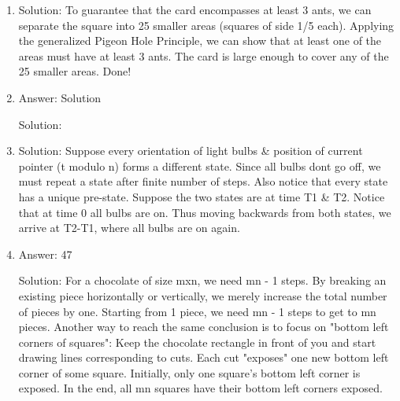 \begin{enumerate}
\item
Solution: To guarantee that the card encompasses at least 3 ants, we can separate the square into 25 smaller areas (squares of side 1/5 each). Applying the generalized Pigeon Hole Principle, we can show that at least one of the areas must have at least 3 ants. The card is large enough to cover any of the 25 smaller areas. Done!




\item
Answer: Solution
 
Solution: 




\item
Solution: Suppose every orientation of light bulbs \& position of current pointer (t modulo n) forms a different state. Since all bulbs dont go off, we must repeat a state after finite number of steps. Also notice that every state has a unique pre-state. Suppose the two states are at time T1 \& T2. Notice that at time 0 all bulbs are on. Thus moving backwards from both states, we arrive at T2-T1, where all bulbs are on again.




\item
Answer: 47
 
Solution: For a chocolate of size mxn, we need mn - 1 steps. By breaking an existing piece horizontally or vertically, we merely increase the total number of pieces by one. Starting from 1 piece, we need mn - 1 steps to get to mn pieces.
Another way to reach the same conclusion is to focus on "bottom left corners of squares": Keep the chocolate rectangle in front of you and start drawing lines corresponding to cuts. Each cut "exposes" one new bottom left corner of some square. Initially, only one square's bottom left corner is exposed. In the end, all mn squares have their bottom left corners exposed.




\end{enumerate}
